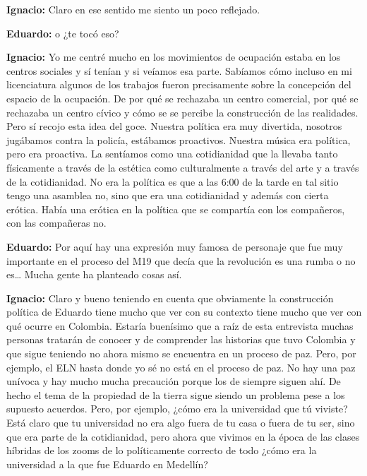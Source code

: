 \documentclass[
]{interact}
\begin{document}
\textbf{Ignacio:} Claro en ese sentido me siento un poco reflejado.

\textbf{Eduardo:} o ¿te tocó eso?

\textbf{Ignacio:} Yo me centré mucho en los movimientos de ocupación
estaba en los centros sociales y sí tenían y si veíamos esa parte.
Sabíamos cómo incluso en mi licenciatura algunos de los trabajos fueron
precisamente sobre la concepción del espacio de la ocupación. De por qué
se rechazaba un centro comercial, por qué se rechazaba un centro cívico
y cómo se se percibe la construcción de las realidades. Pero sí recojo
esta idea del goce. Nuestra política era muy divertida, nosotros
jugábamos contra la policía, estábamos proactivos. Nuestra música era
política, pero era proactiva. La sentíamos como una cotidianidad que la
llevaba tanto físicamente a través de la estética como culturalmente a
través del arte y a través de la cotidianidad. No era la política es que
a las 6:00 de la tarde en tal sitio tengo una asamblea no, sino que era
una cotidianidad y además con cierta erótica. Había una erótica en la
política que se compartía con los compañeros, con las compañeras no.

\textbf{Eduardo:} Por aquí hay una expresión muy famosa de personaje que
fue muy importante en el proceso del M19 que decía que la revolución es
una rumba o no es\ldots{} Mucha gente ha planteado cosas así.

\textbf{Ignacio:} Claro y bueno teniendo en cuenta que obviamente la
construcción política de Eduardo tiene mucho que ver con su contexto
tiene mucho que ver con qué ocurre en Colombia. Estaría buenísimo que a
raíz de esta entrevista muchas personas tratarán de conocer y de
comprender las historias que tuvo Colombia y que sigue teniendo no ahora
mismo se encuentra en un proceso de paz. Pero, por ejemplo, el ELN hasta
donde yo sé no está en el proceso de paz. No hay una paz unívoca y hay
mucho mucha precaución porque los de siempre siguen ahí. De hecho el
tema de la propiedad de la tierra sigue siendo un problema pese a los
supuesto acuerdos. Pero, por ejemplo, ¿cómo era la universidad que tú
viviste? Está claro que tu universidad no era algo fuera de tu casa o
fuera de tu ser, sino que era parte de la cotidianidad, pero ahora que
vivimos en la época de las clases híbridas de los zooms de lo
políticamente correcto de todo ¿cómo era la universidad a la que fue
Eduardo en Medellín?
\end{document}
